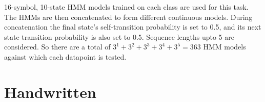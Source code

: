 \documentclass{article}
\begin{document}
16-symbol, 10-state HMM models trained on each class are used for this task. The HMMs are then concatenated to form different continuous models. During concatenation the final state's self-transition probability is set to 0.5, and its next state transition probability is also set to 0.5. Sequence lengths upto 5 are considered. So there are a total of $ 3^1 + 3^2 + 3^3 + 3^4 + 3^5 = 363$ HMM models against which each datapoint is tested.

\newpage
\section{Handwritten}
\end{document}
